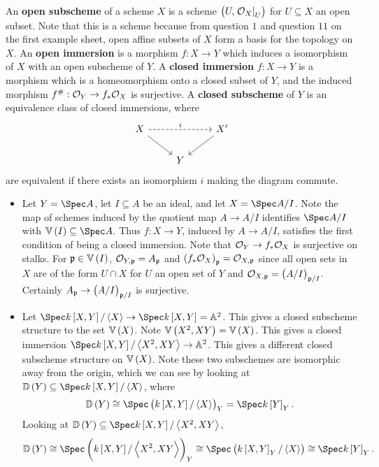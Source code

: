 \begin{definition*}
An \textbf{open subscheme} of a scheme $ X $ is a scheme $ \br{U, \eval{\OOO_X}_U} $ for $ U \subseteq X $ an open subset. Note that this is a scheme because from question $ 1 $ and question $ 11 $ on the first example sheet, open affine subsets of $ X $ form a basis for the topology on $ X $. An \textbf{open immersion} is a morphism $ f : X \to Y $ which induces a isomorphism of $ X $ with an open subscheme of $ Y $. A \textbf{closed immersion} $ f : X \to Y $ is a morphism which is a homeomorphism onto a closed subset of $ Y $, and the induced morphism $ f^\# : \mathcal{O}_Y \to f_*\mathcal{O}_X $ is surjective. A \textbf{closed subscheme} of $ Y $ is an equivalence class of closed immersions, where
$$
\begin{tikzcd}
X \arrow[dashed]{rr}{i} \arrow{dr} & & X' \arrow{dl} \\
& Y &
\end{tikzcd}
$$
are equivalent if there exists an isomorphism $ i $ making the diagram commute.
\end{definition*}

\begin{example*}
\hfill
\begin{itemize}
\item Let $ Y = \Spec A $, let $ I \subseteq A $ be an ideal, and let $ X = \Spec A / I $. Note the map of schemes induced by the quotient map $ A \to A / I $ identifies $ \Spec A / I $ with $ \VV\br{I} \subseteq \Spec A $. Thus $ f : X \to Y $, induced by $ A \to A / I $, satisfies the first condition of being a closed immersion. Note that $ \mathcal{O}_Y \to f_*\mathcal{O}_X $ is surjective on stalks. For $ \ppp \in \VV\br{I} $, $ \mathcal{O}_{Y, \mathfrak{p}} = A_{\mathfrak{p}} $ and $ \br{f_*\OOO_X}_\ppp = \OOO_{X, \ppp} $ since all open sets in $ X $ are of the form $ U \cap X $ for $ U $ an open set of $ Y $ and $ \OOO_{X, \ppp} = \br{A / I}_{\ppp / I} $. Certainly $ A_\ppp \to \br{A / I}_{\ppp / I} $ is surjective.
\item Let $ \Spec k\sbr{X, Y} / \abr{X} \to \Spec k\sbr{X, Y} = \AA^2 $. This gives a closed subscheme structure to the set $ \VV\br{X} $. Note $ \VV\br{X^2, XY} = \VV\br{X} $. This gives a closed immersion $ \Spec k\sbr{X, Y} / \abr{X^2, XY} \to \AA^2 $. This gives a different closed subscheme structure on $ \VV\br{X} $. Note these two subschemes are isomorphic away from the origin, which we can see by looking at $ \DD\br{Y} \subseteq \Spec k\sbr{X, Y} / \abr{X} $, where
$$ \DD\br{Y} \cong \Spec \br{k\sbr{X, Y} / \abr{X}}_Y = \Spec k\sbr{Y}_Y. $$
Looking at $ \DD\br{Y} \subseteq \Spec k\sbr{X, Y} / \abr{X^2, XY} $,
$$ \DD\br{Y} \cong \Spec \br{k\sbr{X, Y} / \abr{X^2, XY}}_Y \cong \Spec \br{k\sbr{X, Y}_Y / \abr{X}} \cong \Spec k\sbr{Y}_Y. $$
\end{itemize}
\end{example*}

